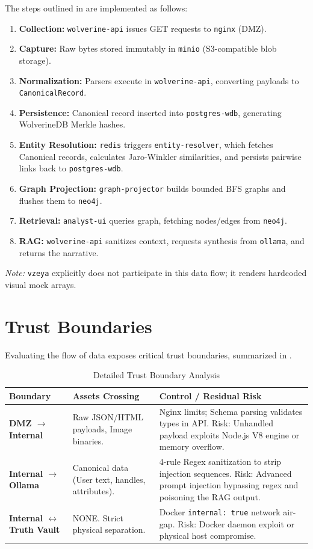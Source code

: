 The steps outlined in  are implemented as follows:
\begin{enumerate}
    \item \textbf{Collection:} \texttt{wolverine-api} issues GET requests to \texttt{nginx} (DMZ).
    \item \textbf{Capture:} Raw bytes stored immutably in \texttt{minio} (S3-compatible blob storage).
    \item \textbf{Normalization:} Parsers execute in \texttt{wolverine-api}, converting payloads to \texttt{CanonicalRecord}.
    \item \textbf{Persistence:} Canonical record inserted into \texttt{postgres-wdb}, generating WolverineDB Merkle hashes.
    \item \textbf{Entity Resolution:} \texttt{redis} triggers \texttt{entity-resolver}, which fetches Canonical records, calculates Jaro-Winkler similarities, and persists pairwise links back to \texttt{postgres-wdb}.
    \item \textbf{Graph Projection:} \texttt{graph-projector} builds bounded BFS graphs and flushes them to \texttt{neo4j}.
    \item \textbf{Retrieval:} \texttt{analyst-ui} queries graph, fetching nodes/edges from \texttt{neo4j}.
    \item \textbf{RAG:} \texttt{wolverine-api} sanitizes context, requests synthesis from \texttt{ollama}, and returns the narrative.
\end{enumerate}
\textit{Note:} \texttt{vzeya} explicitly does not participate in this data flow; it renders hardcoded visual mock arrays.

\section{Trust Boundaries}
\label{sec:arch-trust}
Evaluating the flow of data exposes critical trust boundaries, summarized in .

\begin{table}[htbp]
\centering
\begin{tabular}{p{} p{} p{}}
\toprule
\textbf{Boundary} & \textbf{Assets Crossing} & \textbf{Control / Residual Risk} \\
\midrule
\textbf{DMZ $\rightarrow$ Internal} & Raw JSON/HTML payloads, Image binaries. & Nginx limits; Schema parsing validates types in API. Risk: Unhandled payload exploits Node.js V8 engine or memory overflow. \\
\addlinespace
\textbf{Internal $\rightarrow$ Ollama} & Canonical data (User text, handles, attributes). & 4-rule Regex sanitization to strip injection sequences. Risk: Advanced prompt injection bypassing regex and poisoning the RAG output. \\
\addlinespace
\textbf{Internal $\leftrightarrow$ Truth Vault} & NONE. Strict physical separation. & Docker \texttt{internal: true} network air-gap. Risk: Docker daemon exploit or physical host compromise. \\
\bottomrule
\end{tabular}
\caption{Detailed Trust Boundary Analysis}
\label{tab:trust-boundaries}
\end{table}


